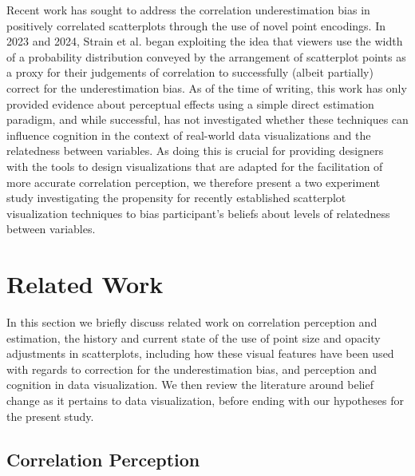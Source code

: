 \documentclass[manuscript,screen,review]{acmart}
\begin{document}
Recent work has sought to address the correlation underestimation bias
in positively correlated scatterplots through the use of novel point
encodings. In 2023 and 2024, Strain et al.
\citep{strain_2023, strain_2023b, strain_2024} began exploiting the idea
that viewers use the width of a probability distribution conveyed by the
arrangement of scatterplot points as a proxy for their judgements of
correlation to successfully (albeit partially) correct for the
underestimation bias. As of the time of writing, this work has only
provided evidence about perceptual effects using a simple direct
estimation paradigm, and while successful, has not investigated whether
these techniques can influence cognition in the context of real-world
data visualizations and the relatedness between variables. As doing this
is crucial for providing designers with the tools to design
visualizations that are adapted for the facilitation of more accurate
correlation perception, we therefore present a two experiment study
investigating the propensity for recently established scatterplot
visualization techniques to bias participant's beliefs about levels of
relatedness between variables.

\section{Related Work}\label{sec-rel-work-main}

In this section we briefly discuss related work on correlation
perception and estimation, the history and current state of the use of
point size and opacity adjustments in scatterplots, including how these
visual features have been used with regards to correction for the
underestimation bias, and perception and cognition in data
visualization. We then review the literature around belief change as it
pertains to data visualization, before ending with our hypotheses for
the present study.

\subsection{Correlation Perception}\label{correlation-perception}
\end{document}
